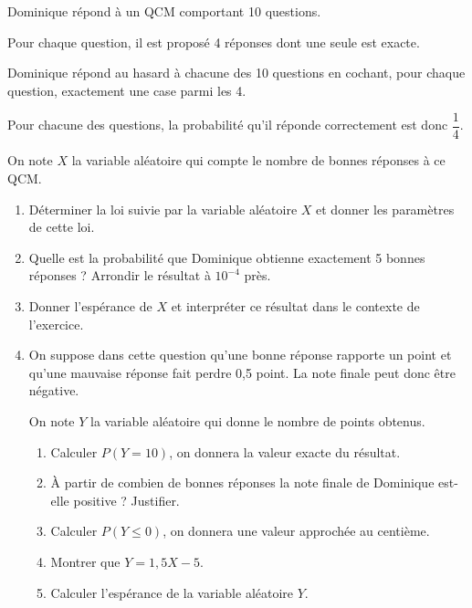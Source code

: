 Dominique répond à un QCM comportant 10 questions.

Pour chaque question, il est proposé 4 réponses dont une seule est exacte.

Dominique répond au hasard à chacune des 10 questions en cochant, pour chaque question, exactement une case parmi les 4.

Pour chacune des questions, la probabilité qu'il réponde correctement est donc $\dfrac{1}{4}$.

On note $X$ la variable aléatoire qui compte le nombre de bonnes réponses à ce QCM.

\begin{enumerate}
\item Déterminer la loi suivie par la variable aléatoire $X$ et donner les paramètres de cette loi.

\item Quelle est la probabilité que Dominique obtienne exactement 5 bonnes réponses ? Arrondir le résultat à $10^{-4}$ près.

\item Donner l'espérance de $X$ et interpréter ce résultat dans le contexte de l'exercice.

\item On suppose dans cette question qu'une bonne réponse rapporte un point et qu'une mauvaise réponse fait perdre 0,5 point. La note finale peut donc être négative.

On note $Y$ la variable aléatoire qui donne le nombre de points obtenus.

	\begin{enumerate}
		\item Calculer $P(Y=10)$, on donnera la valeur exacte du résultat.

		\item À partir de combien de bonnes réponses la note finale de Dominique est-elle positive ? Justifier.

		\item Calculer $P(Y \leqslant 0)$, on donnera une valeur approchée au centième.

		\item Montrer que $Y=1,5 X-5$.

		\item Calculer l'espérance de la variable aléatoire $Y$.
	\end{enumerate}
\end{enumerate}
